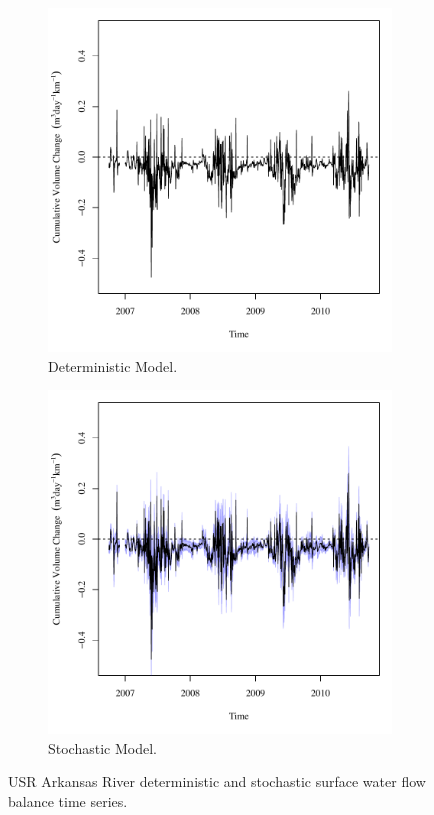 \begin{linenumbers}
\begin{figure}[htbp]
\centering
	\begin{subfigure}{0.5\textwidth}
		\centering
		\includegraphics[width=0.9\linewidth]{"Figures/Results_DUSR/Balance Water - flow"}
		\caption{Deterministic Model.}
		\label{sub:USRWaterFlowD}
	\end{subfigure}%
	\begin{subfigure}{0.5\textwidth}
		\centering
		\includegraphics[width=0.9\linewidth]{"Figures/Results_USR/Balance Water - flow"}
		\caption{Stochastic Model.}
		\label{sub:USRWaterFlowS}
	\end{subfigure}
	\caption[USR Arkansas River deterministic and stochastic surface water flow balance time series.]{USR Arkansas River deterministic and stochastic surface water flow balance time series.}
	\label{fig:USRWaterFlow}
\end{figure}


\end{linenumbers}
